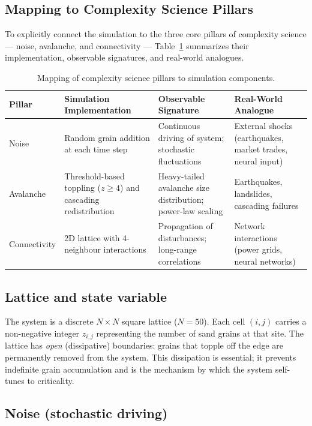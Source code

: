 \documentclass[12pt,a4paper]{article}
\begin{document}
\subsection{Mapping to Complexity Science Pillars}
\label{sec:pillars}

To explicitly connect the simulation to the three core pillars of complexity science
— noise, avalanche, and connectivity — Table~\ref{tab:pillars} summarizes their
implementation, observable signatures, and real-world analogues.

\begin{table}[H]
\centering
\caption{Mapping of complexity science pillars to simulation components.}
\label{tab:pillars}
\begin{tabular}{p{3cm} p{4cm} p{4cm} p{4cm}}
\toprule
\textbf{Pillar} & \textbf{Simulation Implementation} & \textbf{Observable Signature} & \textbf{Real-World Analogue} \\
\midrule
Noise & Random grain addition at each time step & Continuous driving of system; stochastic fluctuations & External shocks (earthquakes, market trades, neural input) \\
\addlinespace
Avalanche & Threshold-based toppling ($z \geq 4$) and cascading redistribution & Heavy-tailed avalanche size distribution; power-law scaling & Earthquakes, landslides, cascading failures \\
\addlinespace
Connectivity & 2D lattice with 4-neighbour interactions & Propagation of disturbances; long-range correlations & Network interactions (power grids, neural networks) \\
\bottomrule
\end{tabular}
\end{table}
\label{sec:system}

\subsection{Lattice and state variable}

The system is a discrete $N\times N$ square lattice ($N=50$).  Each cell $(i,j)$
carries a non-negative integer $z_{i,j}$ representing the number of sand grains at
that site.  The lattice has \emph{open} (dissipative) boundaries: grains that topple
off the edge are permanently removed from the system.  This dissipation is essential;
it prevents indefinite grain accumulation and is the mechanism by which the system
self-tunes to criticality.

\subsection{Noise (stochastic driving)}
\end{document}
